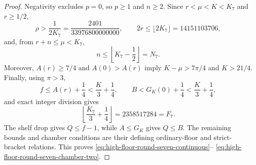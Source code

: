 \documentclass[11pt]{article}
\theoremstyle{remark}
\begin{document}
\begin{proof}
Negativity excludes $p=0$, so $p\geq1$ and $n\geq2$.  Since
$r<\mu<K<K_7$ and $r\geq1/2$,
\[
 \rho>\frac1{2K_7}=\frac{2401}{33976800000000},
 \qquad
 2r\leq\lfloor2K_7\rfloor=14151103706,
\]
and, from $r+n\leq\mu<K_7$,
\[
 n\leq\left\lfloor K_7-\frac12\right\rfloor=N_7.
\]
Moreover, $A(r)\geq7/4$ and $A(0)>A(r)$ imply
$K-\mu>7\pi/4$ and $K>21/4$.  Finally, using $\pi>3$,
\[
 f\leq A(r)+\frac14<\frac K3+\frac14,
 \qquad
 B<G_K(0)+\frac14<\frac K3+\frac14,
\]
and exact integer division gives
\[
 \left\lfloor\frac{K_7}{3}+\frac14\right\rfloor
 =2358517284=F_7.
\]
The shelf drop gives $Q\leq f-1$, while $A\leq G_K$ gives $Q\leq B$.
The remaining bounds and chamber conditions are their defining
ordinary-floor and strict-bracket relations.  This proves
\eqref{eq:high-floor-round-seven-continuous}--
\eqref{eq:high-floor-round-seven-chamber-two}.
\end{proof}
\end{document}
